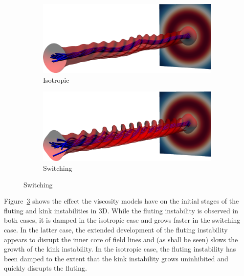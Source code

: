 \begin{figure}[t]
  \centering
    \begin{subfigure}{0.49\textwidth}
      \includegraphics[width=\linewidth]{field_line_plots/cropped/v-4r-4-isotropic_0014_cropped.png}
      \caption{Isotropic}
      \label{fig:field_line_plots_iso}
    \end{subfigure}
    \hfill
    \begin{subfigure}{0.49\textwidth}
      \includegraphics[width=\linewidth]{field_line_plots/cropped/v-4r-4-switching_0014_cropped.png}
      \caption{Switching}
      \label{fig:field_line_plots_swi}
    \end{subfigure}
\label{fig:kink_field_line_plots}%
\end{figure}

Figure~\ref{fig:kink_field_line_plots} shows the effect the viscosity models have on the initial stages of the fluting and kink instabilities in 3D. While the fluting instability is observed in both cases, it is damped in the isotropic case and grows faster in the switching case. In the latter case, the extended development of the fluting instability appears to disrupt the inner core of field lines and (as shall be seen) slows the growth of the kink instability. In the isotropic case, the fluting instability has been damped to the extent that the kink instability grows uninhibited and quickly disrupts the fluting.

